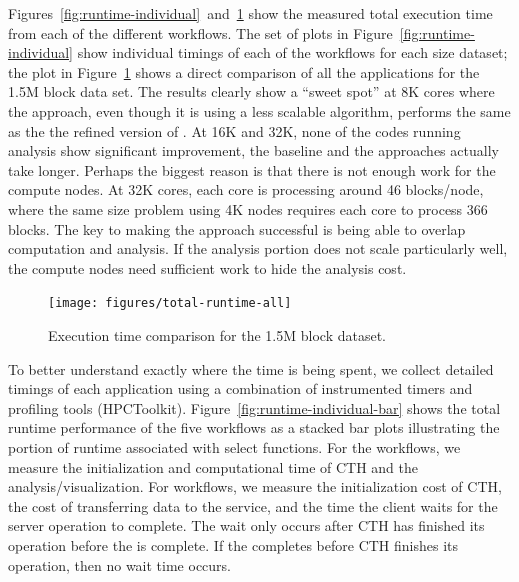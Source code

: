 Figures~\ref{fig:runtime-individual}~and~\ref{fig:runtime-total} show the
measured total execution time from each of the different workflows.  The
set of plots in Figure~\ref{fig:runtime-individual} show individual timings
of each of the workflows for each size dataset; the plot in
Figure~\ref{fig:runtime-total} shows a direct comparison of all the
applications for the 1.5M block data set.  The results clearly show a
``sweet spot'' at 8K cores where the \intransit approach, even though it is
using a less scalable algorithm, performs the same as the the refined
version of \insitu.  At 16K and 32K, none of the codes running analysis
show significant improvement, the baseline \insitu and the \intransit
approaches actually take longer.  Perhaps the biggest reason is that there
is not enough work for the compute nodes.  At 32K cores, each core is
processing around 46 blocks/node, where the same size problem using 4K
nodes requires each core to process 366 blocks.  The key to making the
\intransit approach successful is being able to overlap computation and
analysis.  If the analysis portion does not scale particularly well, the
compute nodes need sufficient work to hide the analysis cost.

\begin{figure}[htbp]
\begin{centering}
\texttt{[image: figures/total-runtime-all]}
\\ 
\caption{Execution time comparison for the 1.5M block dataset.}
\label{fig:runtime-total}
\par\end{centering}
\end{figure}

To better understand exactly where the time is being spent, we collect
detailed timings of each application using a combination of instrumented timers
and profiling tools (HPCToolkit).  Figure~\ref{fig:runtime-individual-bar} shows
the total runtime performance of the five workflows as a stacked bar plots
illustrating the portion of runtime associated with select functions.  For the
\insitu workflows, we measure the initialization and computational time of
CTH and the analysis/visualization.  For \intransit workflows, we measure
the initialization cost of CTH, the cost of transferring data to the service,
and the time the client waits for the server operation to complete. The wait
only occurs after CTH has finished its operation before the \vda is
complete.  If the \vda completes before CTH finishes its operation, then no
wait time occurs. 

